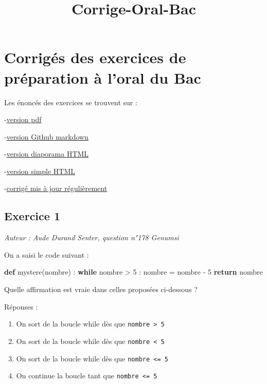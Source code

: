 \documentclass[11pt]{article}
\title{Corrige-Oral-Bac}
\providecommand{\tightlist}{%
      \setlength{\itemsep}{0pt}\setlength{\parskip}{0pt}}
\newenvironment{Shaded}{}{}
\newcommand{\KeywordTok}[1]{\textcolor[rgb]{0.00,0.44,0.13}{\textbf{{#1}}}}
\newcommand{\DecValTok}[1]{\textcolor[rgb]{0.25,0.63,0.44}{{#1}}}
\newcommand{\NormalTok}[1]{{#1}}
\newcommand{\ControlFlowTok}[1]{\textcolor[rgb]{0.00,0.44,0.13}{\textbf{{#1}}}}
\newcommand{\OperatorTok}[1]{\textcolor[rgb]{0.40,0.40,0.40}{{#1}}}
\begin{document}
    
    
    \maketitle
    
    

    
    \hypertarget{corriguxe9s-des-exercices-de-pruxe9paration-uxe0-loral-du-bac}{%
\section{Corrigés des exercices de préparation à l'oral du
Bac}\label{corriguxe9s-des-exercices-de-pruxe9paration-uxe0-loral-du-bac}}

Les énoncés des exercices se trouvent sur :

-\href{OralBac/Preparation-oral-bac-.pdf}{version pdf}

-\href{OralBac/Preparation-oral-bac-git.md}{version Github markdown}

-\href{OralBac/Preparation-oral-bac-slidy.html}{version diaporama HTML}

-\href{OralBac/Preparation-oral-bac-.html}{version simple HTML}

-\href{https://mybinder.org/v2/gh/frederic-junier/ISN/master?filepath=OralBac/Corrige-Oral-Bac.ipynb}{corrigé
mis à jour régulièrement}

    \hypertarget{exercice-1}{%
\subsection{Exercice 1}\label{exercice-1}}

\emph{Auteur : Aude Durand Senter, question n°178 Genumsi}

On a saisi le code suivant :

\begin{Shaded}
\begin{Highlighting}[]
\KeywordTok{def}\NormalTok{ mystere(nombre) :}
    \ControlFlowTok{while}\NormalTok{ nombre }\OperatorTok{>} \DecValTok{5}\NormalTok{ :}
\NormalTok{        nombre }\OperatorTok{=}\NormalTok{ nombre }\OperatorTok{{-}} \DecValTok{5}
\ControlFlowTok{return}\NormalTok{ nombre}
\end{Highlighting}
\end{Shaded}

Quelle affirmation est vraie dans celles proposées ci-dessous ?

Réponses :

\begin{enumerate}
\def\labelenumi{\arabic{enumi}.}
\tightlist
\item
  On sort de la boucle while dès que \texttt{nombre\ \textgreater{}\ 5}
\item
  On sort de la boucle while dès que \texttt{nombre\ \textless{}\ 5}
\item
  On sort de la boucle while dès que \texttt{nombre\ \textless{}=\ 5}
\item
  On continue la boucle tant que \texttt{nombre\ \textless{}=\ 5}
\end{enumerate}
\end{document}
